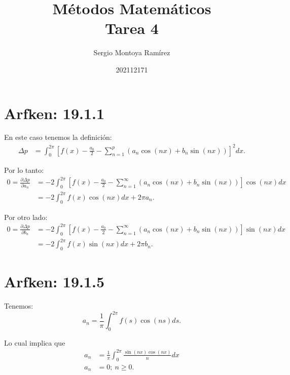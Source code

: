 \documentclass{report}
\title{\Huge{Métodos Matemáticos}\\Tarea 4}
\author{\huge{Sergio Montoya Ramírez}}
\date{202112171}
\begin{document}
\maketitle
\newpage%
\tableofcontents
\pagebreak

\chapter{Arfken: 19.1.1}

En este caso tenemos la definición:
\begin{align*}
  \Delta p &= \int_{0}^{2\pi}\left[ f\left( x \right) - \frac{a_0}{2} - \sum_{n=1}^{p} \left( a_n \cos\left(nx \right) + b_n \sin\left( nx \right) \right)  \right]^2 dx 
.\end{align*}

Por lo tanto:
\begin{align*}
  0 = \frac{\partial \Delta p}{\partial a_n}  &= -2 \int_{0}^{2\pi} \left[ f\left( x \right) - \frac{a_0}{2} - \sum_{n=1}^{\infty} \left( a_n \cos\left( nx \right) + b_n \sin\left( nx \right)  \right)  \right] \cos\left( nx \right) dx\\
  &= -2 \int_{0}^{2\pi} f\left( x \right) \cos\left( nx \right) dx + 2\pi a_n
.\end{align*}

Por otro lado:
\begin{align*}
  0 = \frac{\partial \Delta p}{\partial b_n} &= -2 \int_{0}^{2\pi}\left[ f\left( x \right) - \frac{a_0}{2} - \sum_{n=1}^{\infty} \left( a_n \cos\left( nx \right) + b_n \sin\left( nx \right)  \right)  \right] \sin\left( nx \right) dx \\
  &= -2 \int_{0}^{2\pi} f\left( x \right) \sin\left( nx \right) dx + 2\pi b_n
.\end{align*}

\chapter{Arfken: 19.1.5}

Tenemos: \[
a_n = \frac{1}{\pi}\int_{0}^{2\pi}f\left( s \right) \cos\left( ns \right) ds
.\] 

Lo cual implica que
\begin{align*}
  a_n &= \frac{1}{\pi}\int_{0}^{2\pi} \frac{\sin\left( nx \right) \cos\left( nx \right) }{n} dx \\
  a_n &= 0;\ n \ge 0
.\end{align*}
\end{document}
